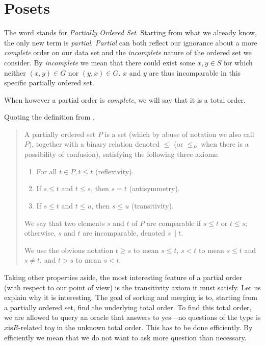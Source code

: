\section{Posets}

The word  stands for \emph{Partially Ordered Set}. Starting from what we already know, the only new term is \emph{partial}. \emph{Partial} can both reflect our ignorance about a more \emph{complete} order on our data set and the \emph{incomplete} nature of the ordered set we consider. By \emph{incomplete} we mean that there could exist some $x, y \in S$ for which neither $(x, y) \in G$ nor $(y, x) \in G$. $x$ and $y$ are thus incomparable in this specific partially ordered set.


When however a partial order is \emph{complete}, we will say that it is a total order.

Quoting the definition from \cite{Stanley:2011:ECV:2124415},

\begin{quotation}

A partially ordered set $P$ is a set (which by abuse of notation we also call $P$), together with a binary relation denoted $\leq$ (or $\leq_P$ when there is a possibility of confusion), satisfying the following three axioms:

\begin{enumerate}
\item For all $t \in P, t \leq t$ (reflexivity).
\item If $s \leq t$ and $t \leq s$, then $s = t$ (antisymmetry).
\item If $s \leq t$ and $t \leq u$, then $s \leq u$ (transitivity).
\end{enumerate}

We say that two elements $s$ and $t$ of $P$ are comparable if $s \leq t$ or $t \leq s$; otherwise, $s$ and $t$ are incomparable, denoted $s \parallel t$.

We use the obvious notation $t \geq s$ to mean $s \leq t$, $s < t$ to mean $s \leq t$ and $s \neq t$, and $t > s$ to mean $s < t$.

\end{quotation}

Taking other properties aside, the most interesting feature of a partial order (with respect to our point of view) is the transitivity axiom it must satisfy. Let us explain why it is interesting. The goal of sorting and merging is to, starting from a partially ordered set, find the underlying total order. To find this total order, we are allowed to query an oracle that answers to yes---no questions of the type is $x \text{is} R\text{-related to} y$ in the unknown total order. This has to be done efficiently. By efficiently we mean that we do not want to ask more question than necessary.

